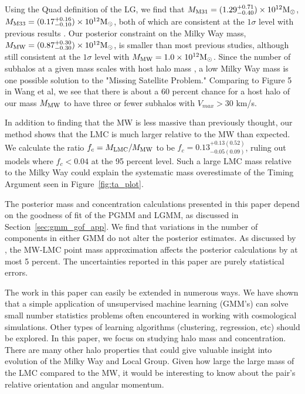 \documentclass[iop,apj,twocolappendix,numberedappendix]{emulateapj}
\newcommand{\MLMC}{M_{\rm LMC}}
\newcommand{\MMW}{{\rm M}_{\rm MW}}
\newcommand{\Msun}{{\rm M}_\odot}
\def\Sref#1{Section~\ref{#1}}
\def\Fref#1{Figure~\ref{#1}}
\def\MMW{M_{\rm MW}}
\def\MEI{M_{\rm M31}}
\def\MEE{M_{\rm M33}}
\def\MMWestimate{0.87}
\def\MMWerrorplus{0.30}
\def\MMWerrorminus{0.30}
\def\MEIestimate{1.29}
\def\MEIerrorplus{0.71}
\def\MEIerrorminus{0.40}
\def\MEEestimate{0.17}
\def\MEEerrorplus{0.16}
\def\MEEerrorminus{0.10}
\begin{document}
Using the Quad definition of the LG, we find that 
$\MEI =
(\MEIestimate^{+\MEIerrorplus}_{-\MEIerrorminus}) \times 10^{12} \Msun$, $\MEE
= (\MEEestimate^{+\MEEerrorplus}_{-\MEEerrorminus}) \times 10^{12} \Msun$,
both of which are consistent at the $1\sigma$ level with previous results \citep{penarrubia2015timing, m33_mass}.
Our posterior constraint on the Milky Way mass, 
$\MMW =
(\MMWestimate^{+\MMWerrorplus}_{-\MMWerrorminus}) \times 10^{12} \Msun$,
is smaller than most previous studies, although still consistent at the $1\sigma$ level with $\MMW = 1.0\times10^{12} \Msun$. 
Since the number of subhalos at a given mass scales with host halo mass \citep{wang2012missing}, a low Milky Way mass is one possible solution to the "Missing Satellite Problem."  Comparing to Figure 5 in Wang et al, we see that there is about a 60 percent chance for a host halo of our mass $\MMW$ to have three or fewer subhalos with $V_{max} > 30$ km/s. 
\par
In addition to finding that the MW is less massive than previously thought, our method shows that the LMC is much larger relative to the MW than expected.  
We calculate the ratio $f_{c} = \MLMC/\MMW$ to be $f_{c} = 0.13^{+0.13 (0.52)}_{-0.05 (0.09)}$, ruling out models where $f_{c} < 0.04$ at the 95 percent level.
Such a large LMC mass relative to the Milky Way could explain the systematic mass overestimate of the Timing Argument seen in \Fref{fig:ta_plot}.
\par
The posterior mass and concentration  calculations presented in this paper depend on the goodness of fit of the PGMM and LGMM, as discussed in \Sref{sec:gmm_gof_app}. 
We find that variations in the number of components in either GMM do not alter the posterior estimates.
As discussed by \cite{kafle2014shoulders}, the MW-LMC point mass approximation affects the posterior calculations by at most 5 percent.
The uncertainties reported in this paper are purely statistical errors.
\par
The work in this paper can easily be extended in numerous ways. 
We have shown that a simple application of unsupervised machine learning (GMM's) can solve small number statistics problems often encountered in working with cosmological simulations.
Other types of learning algorithms (clustering, regression, etc) should be explored.
In this paper, we focus on studying halo mass and concentration. 
There are many other halo properties that could give valuable insight into evolution of the Milky Way and Local Group.
Given how large the large mass of the LMC compared to the MW, it would be interesting to know about the pair's relative orientation and angular momentum.
\end{document}
